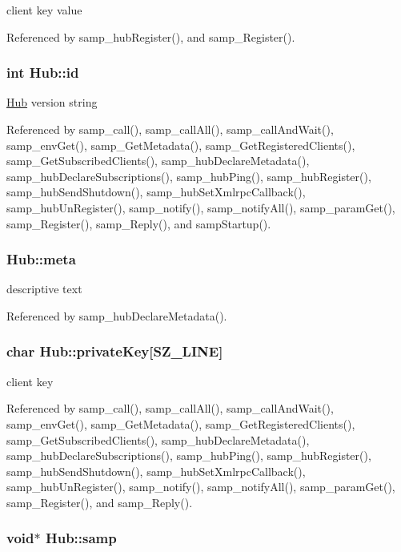client key value 

Referenced by samp\_\-hubRegister(), and samp\_\-Register().\hypertarget{structHub_3546ac45740591096b9bdc4c37b8d5f5}{
\subsubsection[{id}]{\setlength{\rightskip}{0pt plus 5cm}int {\bf Hub::id}}}
\label{structHub_3546ac45740591096b9bdc4c37b8d5f5}


\hyperlink{structHub}{Hub} version string 

Referenced by samp\_\-call(), samp\_\-callAll(), samp\_\-callAndWait(), samp\_\-envGet(), samp\_\-GetMetadata(), samp\_\-GetRegisteredClients(), samp\_\-GetSubscribedClients(), samp\_\-hubDeclareMetadata(), samp\_\-hubDeclareSubscriptions(), samp\_\-hubPing(), samp\_\-hubRegister(), samp\_\-hubSendShutdown(), samp\_\-hubSetXmlrpcCallback(), samp\_\-hubUnRegister(), samp\_\-notify(), samp\_\-notifyAll(), samp\_\-paramGet(), samp\_\-Register(), samp\_\-Reply(), and sampStartup().\hypertarget{structHub_cfe9051f3f0d6fd908ddf394283d1262}{
\subsubsection[{meta}]{ {\bf Hub::meta}}}
\label{structHub_cfe9051f3f0d6fd908ddf394283d1262}


descriptive text 

Referenced by samp\_\-hubDeclareMetadata().\hypertarget{structHub_a7155581e81f30c08103bdcb55b8630a}{
\subsubsection[{privateKey}]{\setlength{\rightskip}{0pt plus 5cm}char {\bf Hub::privateKey}\mbox{[}SZ\_\-LINE\mbox{]}}}
\label{structHub_a7155581e81f30c08103bdcb55b8630a}


client key 

Referenced by samp\_\-call(), samp\_\-callAll(), samp\_\-callAndWait(), samp\_\-envGet(), samp\_\-GetMetadata(), samp\_\-GetRegisteredClients(), samp\_\-GetSubscribedClients(), samp\_\-hubDeclareMetadata(), samp\_\-hubDeclareSubscriptions(), samp\_\-hubPing(), samp\_\-hubRegister(), samp\_\-hubSendShutdown(), samp\_\-hubSetXmlrpcCallback(), samp\_\-hubUnRegister(), samp\_\-notify(), samp\_\-notifyAll(), samp\_\-paramGet(), samp\_\-Register(), and samp\_\-Reply().\hypertarget{structHub_8c5492d9cee801c7846d4a3012aea92a}{
\subsubsection[{samp}]{\setlength{\rightskip}{0pt plus 5cm}void$\ast$ {\bf Hub::samp}}}
\label{structHub_8c5492d9cee801c7846d4a3012aea92a}


